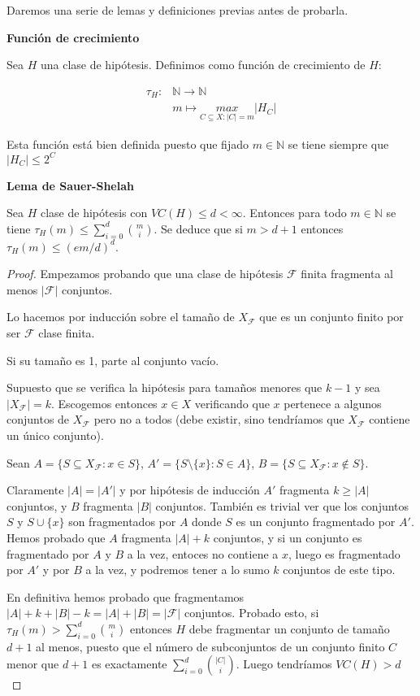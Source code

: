 Daremos una serie de lemas y definiciones previas antes de probarla.

\begin{definition}
\textbf{Función de crecimiento}

Sea $H$ una clase de hipótesis. Definimos como función de crecimiento de $H$:

\[\begin{array}{ll}
\tau_{H}: & \mathbb{N} \rightarrow \mathbb{N}\\
                    & m          \mapsto     \underset{C \subseteq X: |C|=m}{max}{|H_C|}
\end{array}\]

Esta función está bien definida puesto que fijado $m \in \mathbb{N}$ se tiene siempre que $|H_C| \le 2^C$
\end{definition}

\begin{lemma}
\textbf{Lema de Sauer-Shelah}

Sea $H$ clase de hipótesis con $VC(H) \le d < \infty$. Entonces para todo $m\in \mathbb{N}$ se tiene $\tau_{H} (m) \le \sum_{i=0}^d \binom{m}{i}$. Se deduce que si $m > d+1$ entonces $\tau_{H}(m) \le (em/d)^d$.
\end{lemma}


\begin{proof}
Empezamos probando que una clase de hipótesis $\mathcal{F}$ finita fragmenta al menos $|\mathcal{F}|$ conjuntos.

Lo hacemos por inducción sobre el tamaño de $X_\mathcal{F}$ que es un conjunto finito por ser $\mathcal{F}$ clase finita.

Si su tamaño es 1, parte al conjunto vacío.

Supuesto que se verifica la hipótesis para tamaños menores que $k-1$ y sea $|X_\mathcal{F}| = k$. Escogemos entonces $x\in X$ verificando que $x$ pertenece a algunos conjuntos de $X_\mathcal{F}$ pero no a todos (debe existir, sino tendríamos que $X_\mathcal{F}$ contiene un único conjunto).

Sean $A = \{S \subseteq X_\mathcal{F} : x\in S\}$, $A'=\{S\setminus\{x\} : S \in A\}$, $B= \{S \subseteq X_\mathcal{F} : x\not\in S\}$.

Claramente $|A| = |A'|$ y por hipótesis de inducción $A'$ fragmenta $k \ge |A|$ conjuntos, y $B$ fragmenta $|B|$ conjuntos. También es trivial ver que los conjuntos $S$ y $S\cup \{x\}$ son fragmentados por $A$ donde $S$ es un conjunto fragmentado por $A'$. Hemos probado que $A$ fragmenta $|A| + k$ conjuntos, y si un conjunto es fragmentado por $A$ y $B$ a la vez, entoces no contiene a $x$, luego es fragmentado por $A'$ y por $B$ a la vez, y podremos tener a lo sumo $k$ conjuntos de este tipo.

En definitiva hemos probado que fragmentamos $|A| + k + |B| - k = |A| + |B| = |\mathcal{F}|$ conjuntos.
Probado esto, si $\tau_{H}(m) > \sum_{i=0}^d \binom{m}{i}$ entonces $H$ debe fragmentar un conjunto de tamaño 
$d+1$ al menos, puesto que el número de subconjuntos de un conjunto finito $C$ menor que  $d+1$ es exactamente
$\sum_{i=0}^d \binom{|C|}{i}$. Luego tendríamos $VC(H) > d$
\end{proof}